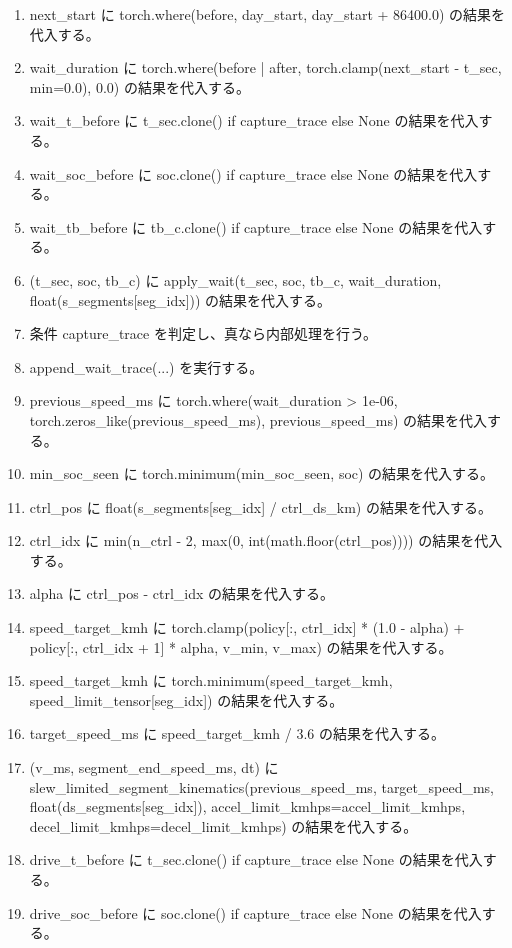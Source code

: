 \documentclass[a4paper,11pt]{article}
\begin{document}
\begin{enumerate}[leftmargin=1.8em]
\item   next\_start に torch.where(before, day\_start, day\_start + 86400.0) の結果を代入する。
\item   wait\_duration に torch.where(before | after, torch.clamp(next\_start - t\_sec, min=0.0), 0.0) の結果を代入する。
\item   wait\_t\_before に t\_sec.clone() if capture\_trace else None の結果を代入する。
\item   wait\_soc\_before に soc.clone() if capture\_trace else None の結果を代入する。
\item   wait\_tb\_before に tb\_c.clone() if capture\_trace else None の結果を代入する。
\item   (t\_sec, soc, tb\_c) に apply\_wait(t\_sec, soc, tb\_c, wait\_duration, float(s\_segments[seg\_idx])) の結果を代入する。
\item   条件 capture\_trace を判定し、真なら内部処理を行う。
\item     append\_wait\_trace(...) を実行する。
\item   previous\_speed\_ms に torch.where(wait\_duration > 1e-06, torch.zeros\_like(previous\_speed\_ms), previous\_speed\_ms) の結果を代入する。
\item   min\_soc\_seen に torch.minimum(min\_soc\_seen, soc) の結果を代入する。
\item   ctrl\_pos に float(s\_segments[seg\_idx] / ctrl\_ds\_km) の結果を代入する。
\item   ctrl\_idx に min(n\_ctrl - 2, max(0, int(math.floor(ctrl\_pos)))) の結果を代入する。
\item   alpha に ctrl\_pos - ctrl\_idx の結果を代入する。
\item   speed\_target\_kmh に torch.clamp(policy[:, ctrl\_idx] * (1.0 - alpha) + policy[:, ctrl\_idx + 1] * alpha, v\_min, v\_max) の結果を代入する。
\item   speed\_target\_kmh に torch.minimum(speed\_target\_kmh, speed\_limit\_tensor[seg\_idx]) の結果を代入する。
\item   target\_speed\_ms に speed\_target\_kmh / 3.6 の結果を代入する。
\item   (v\_ms, segment\_end\_speed\_ms, dt) に slew\_limited\_segment\_kinematics(previous\_speed\_ms, target\_speed\_ms, float(ds\_segments[seg\_idx]), accel\_limit\_kmhps=accel\_limit\_kmhps, decel\_limit\_kmhps=decel\_limit\_kmhps) の結果を代入する。
\item   drive\_t\_before に t\_sec.clone() if capture\_trace else None の結果を代入する。
\item   drive\_soc\_before に soc.clone() if capture\_trace else None の結果を代入する。

\end{enumerate}
\end{document}
